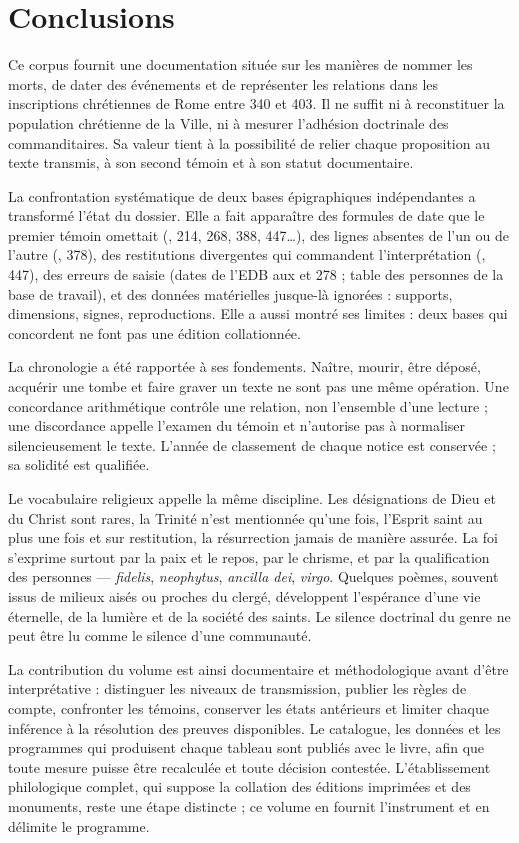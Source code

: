 \chapter{Conclusions}\label{ch:conclusions}

Ce corpus fournit une documentation située sur les manières de nommer les morts, de dater des événements et de représenter les relations dans les inscriptions chrétiennes de Rome entre 340 et 403. Il ne suffit ni à reconstituer la population chrétienne de la Ville, ni à mesurer l’adhésion doctrinale des commanditaires. Sa valeur tient à la possibilité de relier chaque proposition au texte transmis, à son second témoin et à son statut documentaire.

La confrontation systématique de deux bases épigraphiques indépendantes a transformé l’état du dossier. Elle a fait apparaître des formules de date que le premier témoin omettait (, 214, 268, 388, 447…), des lignes absentes de l’un ou de l’autre (, 378), des restitutions divergentes qui commandent l’interprétation (, 447), des erreurs de saisie (dates de l’EDB aux  et 278 ; table des personnes de la base de travail), et des données matérielles jusque-là ignorées : supports, dimensions, signes, reproductions. Elle a aussi montré ses limites : deux bases qui concordent ne font pas une édition collationnée.

La chronologie a été rapportée à ses fondements. Naître, mourir, être déposé, acquérir une tombe et faire graver un texte ne sont pas une même opération. Une concordance arithmétique contrôle une relation, non l’ensemble d’une lecture ; une discordance appelle l’examen du témoin et n’autorise pas à normaliser silencieusement le texte. L’année de classement de chaque notice est conservée ; sa solidité est qualifiée.

Le vocabulaire religieux appelle la même discipline. Les désignations de Dieu et du Christ sont rares, la Trinité n’est mentionnée qu’une fois, l’Esprit saint au plus une fois et sur restitution, la résurrection jamais de manière assurée. La foi s’exprime surtout par la paix et le repos, par le chrisme, et par la qualification des personnes — \emph{fidelis}, \emph{neophytus}, \emph{ancilla dei}, \emph{virgo}. Quelques poèmes, souvent issus de milieux aisés ou proches du clergé, développent l’espérance d’une vie éternelle, de la lumière et de la société des saints. Le silence doctrinal du genre ne peut être lu comme le silence d’une communauté.

La contribution du volume est ainsi documentaire et méthodologique avant d’être interprétative : distinguer les niveaux de transmission, publier les règles de compte, confronter les témoins, conserver les états antérieurs et limiter chaque inférence à la résolution des preuves disponibles. Le catalogue, les données et les programmes qui produisent chaque tableau sont publiés avec le livre, afin que toute mesure puisse être recalculée et toute décision contestée. L’établissement philologique complet, qui suppose la collation des éditions imprimées et des monuments, reste une étape distincte ; ce volume en fournit l’instrument et en délimite le programme.
